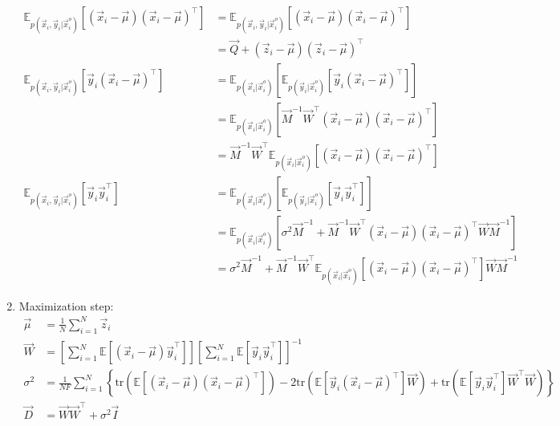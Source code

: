 \documentclass[12pt,twoside]{article}
\begin{document}
\begin{enumerate}
		\begin{align*}
			\mathbb{E}_{p(\vec{x}_i,\vec{y}_i\vert \vec{x}_i^o)}[(\vec{x}_i-\vec{\mu})(\vec{x}_i-\vec{\mu})^\top] 
			&=\mathbb{E}_{p(\vec{x}_i,\vec{y}_i\vert \vec{x}_i^o)}[(\vec{x}_i-\vec{\mu})(\vec{x}_i-\vec{\mu})^\top]\\ 
			&=\vec{Q}+(\vec{z}_i-\vec{\mu})(\vec{z}_i-\vec{\mu})^\top\\ 			
			\mathbb{E}_{p(\vec{x}_i,\vec{y}_i\vert \vec{x}_i^o)}[\vec{y}_i(\vec{x}_i-\vec{\mu})^\top] 
			&=\mathbb{E}_{p(\vec{x}_i\vert \vec{x}_i^o)}\left[\mathbb{E}_{p(\vec{y}_i\vert \vec{x}_i^o)} \left[\vec{y}_i(\vec{x}_i-\vec{\mu})^\top\right]\right] \\
			&=\mathbb{E}_{p(\vec{x}_i\vert \vec{x}_i^o)}\left[\vec{M}^{-1}\vec{W}^\top (\vec{x}_i-\vec{\mu})(\vec{x}_i-\vec{\mu})^\top\right]\\
			& =\vec{M}^{-1}\vec{W}^\top \mathbb{E}_{p(\vec{x}_i\vert \vec{x}_i^o)}\left[(\vec{x}_i-\vec{\mu})(\vec{x}_i-\vec{\mu})^\top\right]\\
			\mathbb{E}_{p(\vec{x}_i,\vec{y}_i\vert \vec{x}_i^o)}[\vec{y}_i\vec{y}_i^\top] 
			&=\mathbb{E}_{p(\vec{x}_i\vert \vec{x}_i^o)}\left[\mathbb{E}_{p(\vec{y}_i\vert \vec{x}_i^o)} \left[\vec{y}_i\vec{y}_i^\top\right]\right] \\
			&=\mathbb{E}_{p(\vec{x}_i\vert \vec{x}_i^o)}\left[\sigma^2 \vec{M}^{-1}+\vec{M}^{-1}\vec{W}^\top (\vec{x}_i-\vec{\mu})(\vec{x}_i-\vec{\mu})^\top\vec{W}\vec{M}^{-1}\right]\\
			& =\sigma^2\vec{M}^{-1}+ \vec{M}^{-1}\vec{W}^\top\mathbb{E}_{p(\vec{x}_i\vert \vec{x}_i^o)}\left[(\vec{x}_i-\vec{\mu})(\vec{x}_i-\vec{\mu})^\top\right] \vec{W} \vec{M}^{-1}
		\end{align*}

	\item Maximization step:
		\begin{align*}
				\vec{\mu}	&=\frac{1}{N}\sum_{i=1}^N \vec{z}_i\\
				\vec{W}	&=\left[\sum_{i=1}^N\mathbb{E}\left[(\vec{x}_i-\vec{\mu})\vec{y}_i^\top\right]\right]\left[\sum_{i=1}^N\mathbb{E}\left[\vec{y}_i\vec{y}_i^\top\right]\right]^{-1}\\
				\sigma^2 &=\frac{1}{NF}\sum_{i=1}^N\left\lbrace \text{tr}\left(\mathbb{E}\left[(\vec{x}_i-\vec{\mu})(\vec{x}_i-\vec{\mu})^\top\right]\right) 
				-2 \text{tr}\left( \mathbb{E} \left[ \vec{y}_i (\vec{x}_i-\vec{\mu})^\top \right]\vec{W} \right)
				+ \text{tr}\left(\mathbb{E}\left[\vec{y}_i\vec{y}_i^\top\right]\vec{W}^\top\vec{W}\right)	
				\right\rbrace\\
				\vec{D} & = \vec{W}\vec{W}^\top +\sigma^2\vec{I}
		\end{align*}			
	

\end{enumerate}
\end{document}
